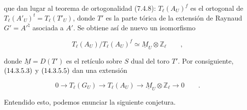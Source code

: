 \noindent
que dan lugar al teorema de ortogonalidad (7.4.8):
$T_\ell(A_U)^f$ es el ortogonal de
$T_\ell(A'_U)^t=T_\ell(T'_U)$, donde $T'$ es la parte tórica de la
extensión de Raynaud $G'={A'}^{\natural}$ asociada a $A'$. Se obtiene
así de nuevo un isomorfismo

\begin{equation}\tag{14.3.5.5}
 T_\ell(A_U)/T_\ell(A_U)^f
 \simeq\underline M_U\otimes\mathbb Z_\ell\qquad ,
\end{equation}

\noindent
donde $\underline M=D(T')$ es el retículo sobre $S$ dual del toro
$T'$. Por consiguiente, $\sisi{(14.3.8)}{(14.3.5.3)}$ y
$\sisi{(14.3.10)}{(14.3.5.5)}$ dan una extensión

\begin{equation}\tag{14.3.5.6}
 0\longrightarrow T_\ell(G_U)\longrightarrow T_\ell(A_U)
 \longrightarrow\underline M_U\otimes\mathbb Z_\ell
 \longrightarrow0\qquad .
\end{equation}

Entendido esto, podemos enunciar la siguiente conjetura.
